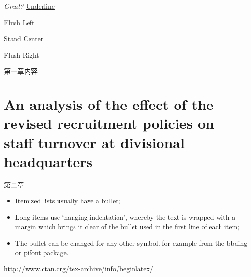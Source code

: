 \documentclass[UTF8, 12pt, a4paper, oneside, titlepage]{book}
\begin{document}
	\textit{Great?}
	\underline{Underline}
	\begin{flushleft}
	Flush Left
	\end{flushleft}
	
	\begin{center}
	Stand Center
	\end{center}
	
	\begin{flushright}
	Flush Right
	\end{flushright}
	

第一章内容
\section[Effect on staff turnover]{An analysis of the 
effect of the revised recruitment policies on staff 
turnover at divisional headquarters}
第二章

\begin{itemize}

\item Itemized lists usually have a bullet;

\item Long items use `hanging indentation', 
whereby the text is wrapped with a margin 
which brings it clear of the bullet used in 
the first line of each item;

\item The bullet can be changed for any other 
symbol, for example from the \textsf{bbding} 
or \textsf{pifont} package.

\end{itemize}

\url{http://www.ctan.org/tex-archive/info/beginlatex/}
\end{document}
